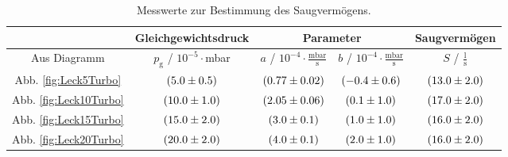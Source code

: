 \begin{table}
   \centering
   \caption{Messwerte zur Bestimmung des Saugvermögens.}
   \label{tab:SaugLeckTurbo}
   \begin{tabular}{c|c|c|c|c}
     & Gleichgewichtsdruck & \multicolumn{2}{c|}{Parameter} & Saugvermögen \\
     \midrule
     Aus Diagramm & $p_\text{g}$ / $10^{-5}\cdot$mbar & $a$ / $10^{-4}\cdot \frac{\text{mbar}}{\text{s}}$ & $b$ / $10^{-4}\cdot \frac{\text{mbar}}{\text{s}}$ & $S$ / $\frac{\text{l}}{\text{s}}$ \\
     \midrule
     Abb. \eqref{fig:Leck5Turbo} & $(\num{5 +- 0.5})$ & $(\num{0.77 +- 0.02})$ & $(\num{-0.4 +- 0.6})$ & $(\num{13.0 +- 2.0})$ \\
     Abb. \eqref{fig:Leck10Turbo} & $(\num{10.0 +- 1.0})$ & $(\num{2.05 +- 0.06})$ & $(\num{0.1 +- 1.0})$ & $(\num{17.0 +- 2.0}) $ \\
     Abb. \eqref{fig:Leck15Turbo} & $(\num{15.0 +- 2.0})$ & $(\num{3.0 +- 0.1})$ & $(\num{1.0 +- 1.0})$ & $(\num{16.0 +- 2.0}) $ \\
     Abb. \eqref{fig:Leck20Turbo} & $(\num{20.0 +- 2.0})$ & $(\num{4.0 +- 0.1})$ & $(\num{2.0 +- 1.0})$ & $(\num{16.0 +- 2.0}) $ \\
  \end{tabular}
\end{table}
